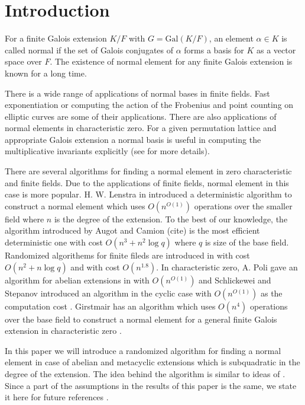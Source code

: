 \section{Introduction}

For a finite Galois extension $K/F$ with $G = \mathrm{Gal}(K/F)$, an element $\alpha \in K$
is called normal if the set of Galois conjugates of $\alpha$ forms a basis for $K$ as a
 vector space over $F$. The existence of normal element for any finite Galois extension is 
 known for a long time.
 
There is a wide range of applications of normal bases in finite fields. Fast exponentiation 
or computing the action of the Frobenius and point counting on elliptic curves are some of their applications. There are also 
applications of normal elements in characteristic zero. For a given permutation lattice and appropriate Galois extension
a normal basis is useful in computing the multiplicative invariants explicitly (see \cite{Armin} for more details).   

There are several algorithms for finding a normal element in zero characteristic and finite fields. Due to the applications of
finite fields, normal element in this case is more popular. H. W. Lenstra in \cite{LenstraNormal} introduced a deterministic 
algorithm to construct a normal element which uses $O(n^{O(1)})$ operations over the smaller field where $n$ is the degree of the
 extension. To the best of
our knowledge, the algorithm introduced by Augot and Camion (cite) is the most efficient deterministic one with cost 
$O(n^3+n^2\log q)$
where $q$ is size of the base field. Randomized algorithems for finite fileds are introduced in \cite{Giesbrecht} with cost
$O(n^2+n\log q)$ and \cite{Kaltofen} with cost $O(n^{1.8})$. In characteristic zero, A. Poli gave an algorithm for abelian extensions in \cite{Poli} with $O(n^{O(1)})$ and Schlickewei and Stepanov introduced an algorithm in the cyclic case with
$O(n^{O(1)})$ as the computation cost \cite{Stepanov}. Girstmair has an algorithm which uses $O(n^4)$ operations over the base field to construct a normal element for a general finite Galois extension in characteristic zero \cite{Girstmair}. 

In this paper we will introduce a randomized algorithm for finding a normal element in case of abelian and metacyclic extensions
 which is subquadratic in the degree of the extension. The idea behind the algorithm is similar to ideas of 
\cite{Giesbrecht,Kaltofen}. Since a part of the assumptions in the results of this paper is the same, we state it here 
for future references .

